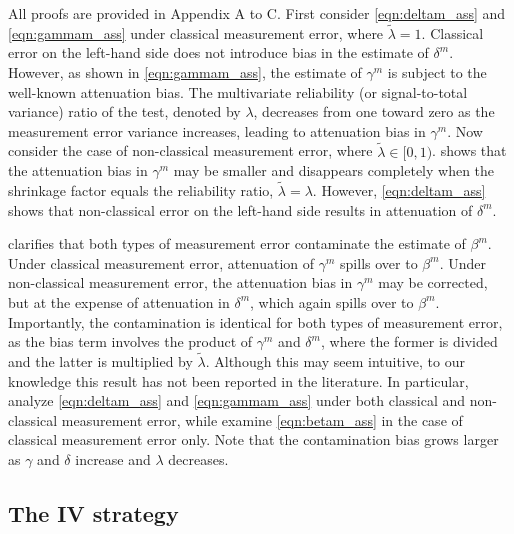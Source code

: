 All proofs are provided in Appendix A to C. First consider \eqref{eqn:deltam_ass} and \eqref{eqn:gammam_ass} under classical measurement error, where $\widetilde{\lambda}=1$. Classical error on the left-hand side does not introduce bias in the estimate of $\delta^m$. However, as shown in \eqref{eqn:gammam_ass}, the estimate of $\gamma^m$ is subject to the well-known attenuation bias. The multivariate reliability (or signal-to-total variance) ratio of the test, denoted by $\lambda$, decreases from one toward zero as the measurement error variance increases, leading to attenuation bias in $\gamma^m$. Now consider the case of non-classical measurement error, where $\widetilde{\lambda} \in [0,1)$.  shows that the attenuation bias in $\gamma^m$ may be smaller and disappears completely when the shrinkage factor equals the reliability ratio, $\widetilde{\lambda} = \lambda$. However, \eqref{eqn:deltam_ass} shows that non-classical error on the left-hand side results in attenuation of $\delta^m$.

 clarifies that both types of measurement error contaminate the estimate of $\beta^m$. Under classical measurement error, attenuation of $\gamma^m$ spills over to $\beta^m$. Under non-classical measurement error, the attenuation bias in $\gamma^m$ may be corrected, but at the expense of attenuation in $\delta^m$, which again spills over to $\beta^m$. Importantly, the contamination is identical for both types of measurement error, as the bias term involves the product of $\gamma^m$ and $\delta^m$, where the former is divided and the latter is multiplied by $\widetilde{\lambda}$. Although this may seem intuitive, to our knowledge this result has not been reported in the literature. In particular, \citet{hyslop2001bias} analyze \eqref{eqn:deltam_ass} and \eqref{eqn:gammam_ass} under both classical and non-classical measurement error, while \citet{pei2019poorly,gillen2019experimenting,ferman2022assessing} examine \eqref{eqn:betam_ass} in the case of classical measurement error only. Note that the contamination bias grows larger as $\gamma$ and $\delta$ increase and $\lambda$ decreases.
 
\subsection{The IV strategy}

